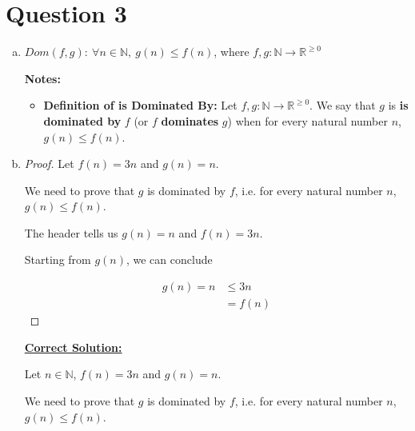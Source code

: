 \documentclass[12pt]{article}
\begin{document}
\section*{Question 3}
\begin{enumerate}[a.]
    \item $Dom(f,g):\:\forall n \in \mathbb{N},\:g(n) \leq f(n)$, where $f,g:\mathbb{N} \to \mathbb{R}^{\geq 0}$

    \bigskip

    \textbf{Notes:}

    \begin{itemize}
        \item \textbf{Definition of is Dominated By:} Let $f,g:\mathbb{N} \to
        \mathbb{R}^{\geq 0}$. We say that $g$ is \textbf{is dominated by} $f$
        (or $f$ \textbf{dominates} $g$) when for every natural number $n$, $g(n) \leq f(n)$.
    \end{itemize}

    \item

    \begin{proof}
    Let $f(n) = 3n$ and $g(n) = n$.

    \bigskip

    We need to prove that $g$ is dominated by $f$, i.e. for every natural number $n$,
    $g(n) \leq f(n)$.

    \bigskip

    The header tells us $g(n) = n$ and $f(n) = 3n$.

    \bigskip

    Starting from $g(n)$, we can conclude

    \setcounter{equation}{0}
    \begin{align}
        g(n) = n &\leq 3n\\
        &= f(n)
    \end{align}

    \end{proof}

    \bigskip

    \begin{mdframed}
        \underline{\textbf{Correct Solution:}}

        \bigskip

        Let \color{red}$n \in \mathbb{N}$\color{black}, $f(n) = 3n$ and $g(n) = n$.

        \bigskip

        We need to prove that $g$ is dominated by $f$, i.e. for every natural number $n$,
        $g(n) \leq f(n)$.


\end{mdframed}
\end{enumerate}
\end{document}
